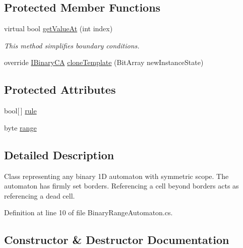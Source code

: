 \subsection*{Protected Member Functions}
\begin{DoxyCompactItemize}
\item 
virtual bool \hyperlink{class_cellular_1_1_binary_range_automaton_a462f8b1d9b77966e14bb0160a4a06dca}{get\+Value\+At} (int index)
\begin{DoxyCompactList}\small\item\em This method simplifies boundary conditions. \end{DoxyCompactList}\item 
override \hyperlink{interface_cellular_1_1_i_binary_c_a}{I\+Binary\+C\+A} \hyperlink{class_cellular_1_1_binary_range_automaton_a75d9e1fc19f9bfc470e66b12aaf1abe8}{clone\+Template} (Bit\+Array new\+Instance\+State)
\end{DoxyCompactItemize}
\subsection*{Protected Attributes}
\begin{DoxyCompactItemize}
\item 
bool\mbox{[}$\,$\mbox{]} \hyperlink{class_cellular_1_1_binary_range_automaton_a4dda99c3151599c8ef12d08d7472144c}{rule}
\item 
byte \hyperlink{class_cellular_1_1_binary_range_automaton_a9a391c738dc7725aa66a52dca039a2f7}{range}
\end{DoxyCompactItemize}


\subsection{Detailed Description}
Class representing any binary 1\+D automaton with symmetric scope. The automaton has firmly set borders. Referencing a cell beyond borders acts as referencing a dead cell. 



Definition at line 10 of file Binary\+Range\+Automaton.\+cs.



\subsection{Constructor \& Destructor Documentation}
\hypertarget{class_cellular_1_1_binary_range_automaton_a3b165a9e98e516bf7e9bdb8bb2fe16a7}{}
